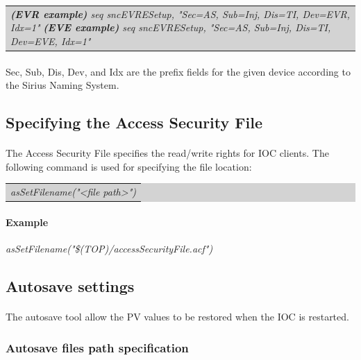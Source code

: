 \documentclass[openany]{article}
\begin{document}
			\bigskip
			\colorbox{lightgray}{
				\begin{tabularx}{0.9\textwidth}{X}
				\emph{{\bfseries(EVR example)} seq sncEVRESetup, "Sec=AS, Sub=Inj, Dis=TI, Dev=EVR, Idx=1"}
				\emph{{\bfseries(EVE example)} seq sncEVRESetup, "Sec=AS, Sub=Inj, Dis=TI, Dev=EVE, Idx=1"}
				\end{tabularx}
			}

			\paragraph{} Sec, Sub, Dis, Dev, and Idx are the prefix fields for the given device according to the Sirius Naming System.

	\subsection{Specifying the Access Security File}

		\paragraph{} The Access Security File specifies the read/write rights for IOC clients. The following command is used for specifying the file location:

		\bigskip
		\colorbox{lightgray}{
			\begin{tabularx}{0.9\textwidth}{X}
			\emph{asSetFilename("\textless file path\textgreater")}
			\end{tabularx}
		}

		\paragraph{Example} \emph{asSetFilename("\$(TOP)/accessSecurityFile.acf")}

	\subsection{Autosave settings}

		\paragraph{} The autosave tool allow the PV values to be restored when the IOC is restarted.

		\subsubsection{Autosave files path specification}
\end{document}
